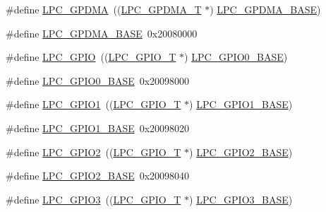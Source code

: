 \begin{DoxyCompactItemize}
\item 
\#define \hyperlink{group__PERIPH__407X__8X__BASE_gaf9d4b843ddff8d08a27880f90e2dbf18}{L\+P\+C\+\_\+\+G\+P\+D\+MA}~((\hyperlink{structLPC__GPDMA__T}{L\+P\+C\+\_\+\+G\+P\+D\+M\+A\+\_\+T}            $\ast$) \hyperlink{group__PERIPH__407X__8X__BASE_ga51ba8e3f33730fa2b78be3f892d8c278}{L\+P\+C\+\_\+\+G\+P\+D\+M\+A\+\_\+\+B\+A\+SE})
\item 
\#define \hyperlink{group__PERIPH__407X__8X__BASE_ga51ba8e3f33730fa2b78be3f892d8c278}{L\+P\+C\+\_\+\+G\+P\+D\+M\+A\+\_\+\+B\+A\+SE}~0x20080000
\item 
\#define \hyperlink{group__PERIPH__407X__8X__BASE_ga8fce6a072685922bf3ebc1aa9070f408}{L\+P\+C\+\_\+\+G\+P\+IO}~((\hyperlink{structLPC__GPIO__T}{L\+P\+C\+\_\+\+G\+P\+I\+O\+\_\+T}             $\ast$) \hyperlink{group__PERIPH__407X__8X__BASE_ga09e0e964ea1abf3b991772df2aa52405}{L\+P\+C\+\_\+\+G\+P\+I\+O0\+\_\+\+B\+A\+SE})
\item 
\#define \hyperlink{group__PERIPH__407X__8X__BASE_ga09e0e964ea1abf3b991772df2aa52405}{L\+P\+C\+\_\+\+G\+P\+I\+O0\+\_\+\+B\+A\+SE}~0x20098000
\item 
\#define \hyperlink{group__PERIPH__407X__8X__BASE_ga335587dad4e6d0da56c1f3ad1c087d10}{L\+P\+C\+\_\+\+G\+P\+I\+O1}~((\hyperlink{structLPC__GPIO__T}{L\+P\+C\+\_\+\+G\+P\+I\+O\+\_\+T}             $\ast$) \hyperlink{group__PERIPH__407X__8X__BASE_ga9fb0536853721a3073bd69d94d0b7ec2}{L\+P\+C\+\_\+\+G\+P\+I\+O1\+\_\+\+B\+A\+SE})
\item 
\#define \hyperlink{group__PERIPH__407X__8X__BASE_ga9fb0536853721a3073bd69d94d0b7ec2}{L\+P\+C\+\_\+\+G\+P\+I\+O1\+\_\+\+B\+A\+SE}~0x20098020
\item 
\#define \hyperlink{group__PERIPH__407X__8X__BASE_ga27a09e8c08f9e209c6af70b0a3c56b39}{L\+P\+C\+\_\+\+G\+P\+I\+O2}~((\hyperlink{structLPC__GPIO__T}{L\+P\+C\+\_\+\+G\+P\+I\+O\+\_\+T}             $\ast$) \hyperlink{group__PERIPH__407X__8X__BASE_gae5524b2d728167194033ec7a1841a36b}{L\+P\+C\+\_\+\+G\+P\+I\+O2\+\_\+\+B\+A\+SE})
\item 
\#define \hyperlink{group__PERIPH__407X__8X__BASE_gae5524b2d728167194033ec7a1841a36b}{L\+P\+C\+\_\+\+G\+P\+I\+O2\+\_\+\+B\+A\+SE}~0x20098040
\item 
\#define \hyperlink{group__PERIPH__407X__8X__BASE_ga6e961eb01d0f1e61dd9b9d5979d2aafc}{L\+P\+C\+\_\+\+G\+P\+I\+O3}~((\hyperlink{structLPC__GPIO__T}{L\+P\+C\+\_\+\+G\+P\+I\+O\+\_\+T}             $\ast$) \hyperlink{group__PERIPH__407X__8X__BASE_ga56c68c5326b521b3278a35f4d81369a9}{L\+P\+C\+\_\+\+G\+P\+I\+O3\+\_\+\+B\+A\+SE})

\end{DoxyCompactItemize}

